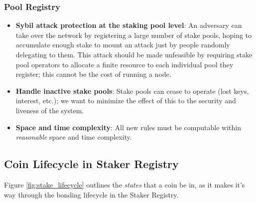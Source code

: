 \subsubsection{Pool Registry}
\begin{itemize}
    \item \textbf{Sybil attack protection at the staking pool level}: An adversary can take over the network by registering a large number of stake pools, hoping to accumulate enough stake to mount an attack just by people randomly delegating to them. This attack should be made unfeasible by requiring stake pool operators to allocate a finite resource to each individual pool they register; this cannot be the cost of running a node.
    \item \textbf{Handle inactive stake pools}: Stake pools can cease to operate (lost keys, interest, etc.); we want to minimize the effect of this to the security and liveness of the system. 
    \item \textbf{Space and time complexity}: All new rules must be computable within \textit{reasonable} space and time complexity. 
\end{itemize}

\subsection{Coin Lifecycle in Staker Registry} \label{stake_concerns}

Figure \ref{fig:stake_lifecycle} outlines the \textit{states} that a coin be in, as it makes it's way through the bonding lifecycle in the Staker Registry.  


